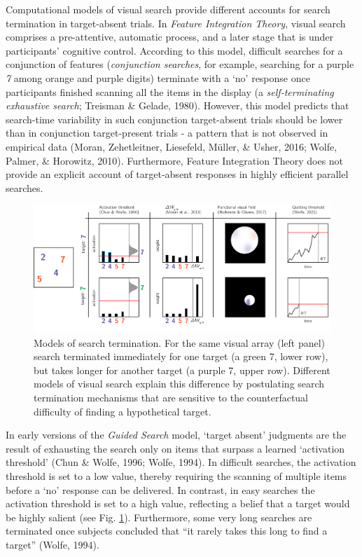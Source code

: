 \documentclass[12pt,twoside]{reedthesis}
\begin{document}
Computational models of visual search provide different accounts for search termination in target-absent trials. In \emph{Feature Integration Theory}, visual search comprises a pre-attentive, automatic process, and a later stage that is under participants' cognitive control. According to this model, difficult searches for a conjunction of features (\emph{conjunction searches}, for example, searching for a purple \emph{7} among orange and purple digits) terminate with a `no' response once participants finished scanning all the items in the display (a \emph{self-terminating exhaustive search}; Treisman \& Gelade, 1980). However, this model predicts that search-time variability in such conjunction target-absent trials should be lower than in conjunction target-present trials - a pattern that is not observed in empirical data (Moran, Zehetleitner, Liesefeld, Müller, \& Usher, 2016; Wolfe, Palmer, \& Horowitz, 2010). Furthermore, Feature Integration Theory does not provide an explicit account of target-absent responses in highly efficient parallel searches.
\begin{figure}
\includegraphics[width=1\linewidth]{figure/intro/termination_models_wide} \caption[Models of search termination]{Models of search termination. For the same visual array (left panel) search terminated immediately for one target (a green 7, lower row), but takes longer for another target (a purple 7, upper row). Different models of visual search explain this difference by postulating search termination mechanisms that are sensitive to the counterfactual difficulty of finding a hypothetical target.}\label{fig:intro-termination-models}
\end{figure}
In early versions of the \emph{Guided Search} model, `target absent' judgments are the result of exhausting the search only on items that surpass a learned `activation threshold' (Chun \& Wolfe, 1996; Wolfe, 1994). In difficult searches, the activation threshold is set to a low value, thereby requiring the scanning of multiple items before a `no' response can be delivered. In contrast, in easy searches the activation threshold is set to a high value, reflecting a belief that a target would be highly salient (see Fig. \ref{fig:intro-termination-models}). Furthermore, some very long searches are terminated once subjects concluded that ``it rarely takes this long to find a target'' (Wolfe, 1994).
\end{document}

